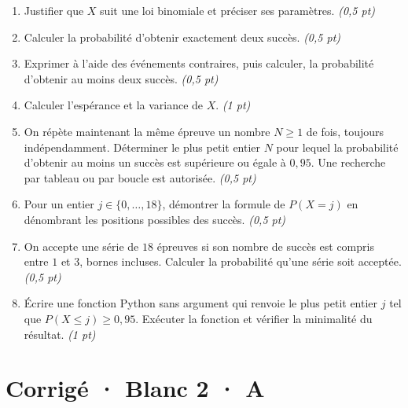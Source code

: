 \begin{enumerate}

\item Justifier que $X$ suit une loi binomiale et préciser ses paramètres. \hfill\textit{(0{,}5 pt)}

\item Calculer la probabilité d'obtenir exactement deux succès. \hfill\textit{(0{,}5 pt)}

\item Exprimer à l'aide des événements contraires, puis calculer, la probabilité d'obtenir au moins deux succès. \hfill\textit{(0{,}5 pt)}

\item Calculer l'espérance et la variance de $X$. \hfill\textit{(1 pt)}

\item On répète maintenant la même épreuve un nombre $N\ge1$ de fois, toujours indépendamment. Déterminer le plus petit entier $N$ pour lequel la probabilité d'obtenir au moins un succès est supérieure ou égale à $0{,}95$. Une recherche par tableau ou par boucle est autorisée. \hfill\textit{(0{,}5 pt)}

\item Pour un entier $j\in\{0,\ldots,18\}$, démontrer la formule de $P(X=j)$ en dénombrant les positions possibles des succès. \hfill\textit{(0{,}5 pt)}

\item On accepte une série de $18$ épreuves si son nombre de succès est compris entre $1$ et $3$, bornes incluses. Calculer la probabilité qu'une série soit acceptée. \hfill\textit{(0{,}5 pt)}

\item Écrire une fonction Python sans argument qui renvoie le plus petit entier $j$ tel que $P(X\le j)\ge0{,}95$. Exécuter la fonction et vérifier la minimalité du résultat. \hfill\textit{(1 pt)}

\end{enumerate}

\ifmxteacher\mxnewpage

\section*{Corrigé · Blanc 2 · A}\label{cor:8-3}

